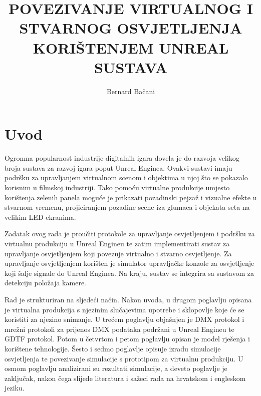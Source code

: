 \documentclass[times, utf8, zavrsni, numeric]{fer}
\begin{document}

\title{POVEZIVANJE VIRTUALNOG I STVARNOG OSVJETLJENJA KORIŠTENJEM UNREAL SUSTAVA}

\author{Bernard Bačani}

\maketitle

\izvornik


\tableofcontents

\chapter{Uvod}
Ogromna popularnost industrije digitalnih igara dovela je do razvoja velikog broja sustava za razvoj igara poput Unreal Enginea. Ovakvi sustavi imaju podršku za upravljanjem virtualnom scenom i objektima u njoj što se pokazalo korisnim u filmskoj industriji. Tako pomoću virtualne produkcije umjesto korištenja zelenih panela moguće je prikazati pozadinski pejzaž i vizualne efekte u stvarnom vremenu, projiciranjem pozadine scene iza glumaca i objekata seta na velikim LED ekranima. \newline

Zadatak ovog rada je proučiti protokole za upravljanje osvjetljenjem i podršku za virtualnu produkciju u Unreal Engineu te zatim implementirati sustav za upravljanje osvjetljenjem koji povezuje virtualno i stvarno osvjetljenje. Za upravljanje osvjetljenjem korišten je simulator upravljačke konzole za osvjetljenje koji šalje signale do Unreal Enginea. Na kraju, sustav se integrira sa sustavom za detekciju položaja kamere. \newline

Rad je strukturiran na sljedeći način. Nakon uvoda, u drugom poglavlju opisana je virtualna produkcija s njezinim slučajevima upotrebe i sklopovlje koje će se koristiti za njezino snimanje. U trećem poglavlju objašnjen je DMX protokol i mrežni protokoli za prijenos DMX podataka podržani u Unreal Engineu te GDTF protokol. Potom u četvrtom i petom poglavlju opisan je model rješenja i korištene tehnologije. Šesto i sedmo poglavlje opisuje izradu simulacije osvjetljenja te povezivanje simulacije s prototipom za virtualnu produkciju. U osmom poglavlju analizirani su rezultati simulacije, a deveto poglavlje je zaključak, nakon čega slijede literatura i sažeci rada na hrvatskom i engleskom jeziku.
\end{document}
